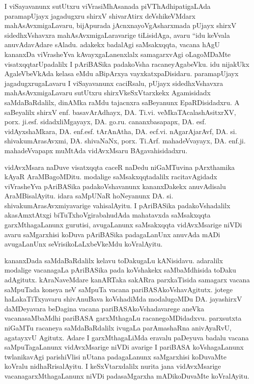 I viSayavanunx sutUtxru viVrasiMhAsanada piVThAdhipatigaLAda paramapUjayx jagadugxru shirxV shivarAtirx deVshikeVMdarx mahAsAvxmigaLavaru, bijApurada jAcnxnayoVgAsharxmada pUjayx shirxV sidedhxVshavxra mahAsAvxmigaLaravarige tiLisidAga, avaru ``idu keVvala anuvAdavAdare sAladu. adakekx badalAgi saMsakxqqta, vacana hAgU kananxDa viVrasheYva kAvayxgaLanenxlalx samagarxvAgi oLagoMDaMte visatxqqta\-rUpadalilx I pAriBASika padakoVsha racaneyAgabeVku. idu nijakUkx AgaleVbeVkAda kelasa eMdu aBipArxya vayxkatxpaDisidaru. paramapUjayx jagadugxrugaLavaru I viSayavanunx caciRsalu, pUjayx sidedhxVshavxra mahAsAvxmigaLavaru sutUtxru shirxVkeSxVtarxkekx Agamisidadx saMdaBaRdalilx, dinAMka  raMdu tajacnxra saBeyanunx EpaRDisidadxru. A saBeyalilx shirxV enf. basavArAdhayx, DA. Ti.vi. veMkaTAcalashAsitxrXV, porx. ji.esf. sidadxliMgayayx, DA. go.ru. cananxbasapapx, DA. esf. vidAyxshaMkara, DA. enf.esf. tArAnAtha, DA. ecf.vi. nAgarAjarAvf, DA. si. shivakumArasAvxmi, DA. shivaNaNx, porx. Ti.Arf. mahadeVvayayx, DA. enf.ji. mahadeVvapapx muMtAda vidAvxMsaru BAgavahisidadxru.

vidAvxMsara naDuve visatxqqta caceR naDedu niGaMTuvina pArxthamika kAyaR AraMBagoMDitu. modalige saMsakxqqtadalilx racita\-vAgidadx viVrasheYva pAriBASika padakoVshavanunx kananxDakekx anuvAdisalu AraMBisalAyitu. idara saMpUNaR hoNeyanunx DA. si. shivakumArasAvxmiyavarige vahisalAyitu. I pAriBASika padakoVshadalilx akasAmxtAtxgi biTuTxhoVgirabahudAda mahatavxda saMsakxqqta garxMthagaLanunx gurutisi, avugaLanunx saMsakxqqta vidAvxMsarige niVDi avaru saMgarxhisi koDuva pAriBASika padagaLanUnx anuvAda mADi avugaLanUnx  seVrisikoLaLxbeVkeMdu koVralAyitu. 

kananxDada saMdaBaRdalilx kelavu toDakugaLu kANisidavu. adaralilx modalige vacanagaLa pAriBASika pada koVshakekx saMbaMdhisida toDaku adAgitutx. kAraNaveMdare kanARTaka sakARra parxkaTisida samagarx vacana saMpuTada koneya neV saMpuTa vacana pari\-BASAkoVshavAgitutx. jotege haLakaTiTxyavaru shivAnuBava koVshadiMda modalugoMDu DA. jayashirxV daMDeyavara beDagina vacana pariBASAkoVshadavarege aneVka vacanasaMbaMdhi pariBASA garxMthagaLu racanegoMDidadxvu. parxsutxta niGaMTu racaneya saMdaBaRdalilx ivugaLa parAmashaRna anivAyaRvU, agatayxvU Agitutx. Adare I garxMthagaLiMda eravalu paDeyuva badalu vacana saMpuTagaLanunx vidAvxMsarige niVDi avarige I pariBASA koVshagaLanunx twlanikavAgi parishiVlisi nUtana padagaLanunx saMgarxhisi koDuvaMte koVralu nidhaRrisalAyitu. I keSxVtarxdalilx nurita  jana vidAvxMsarige vacanagarxMthagaLanunx niVDi padasaMgarxha mADikoDuvaMte koVralAyitu.

